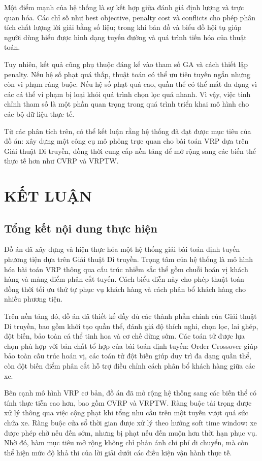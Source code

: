\documentclass[12pt,a4paper]{article}
\numberwithin{figure}{subsection}
\begin{document}
Một điểm mạnh của hệ thống là sự kết hợp giữa đánh giá định lượng và trực quan hóa. Các chỉ số như best objective, penalty cost và conflicts cho phép phân tích chất lượng lời giải bằng số liệu; trong khi bản đồ và biểu đồ hội tụ giúp người dùng hiểu được hình dạng tuyến đường và quá trình tiến hóa của thuật toán.

Tuy nhiên, kết quả cũng phụ thuộc đáng kể vào tham số GA và cách thiết lập penalty. Nếu hệ số phạt quá thấp, thuật toán có thể ưu tiên tuyến ngắn nhưng còn vi phạm ràng buộc. Nếu hệ số phạt quá cao, quần thể có thể mất đa dạng vì các cá thể vi phạm bị loại khỏi quá trình chọn lọc quá nhanh. Vì vậy, việc tinh chỉnh tham số là một phần quan trọng trong quá trình triển khai mô hình cho các bộ dữ liệu thực tế.

Từ các phân tích trên, có thể kết luận rằng hệ thống đã đạt được mục tiêu của đồ án: xây dựng một công cụ mô phỏng trực quan cho bài toán VRP dựa trên Giải thuật Di truyền, đồng thời cung cấp nền tảng để mở rộng sang các biến thể thực tế hơn như CVRP và VRPTW.

\section{KẾT LUẬN}

\subsection{Tổng kết nội dung thực hiện}

Đồ án đã xây dựng và hiện thực hóa một hệ thống giải bài toán định tuyến phương tiện dựa trên Giải thuật Di truyền. Trọng tâm của hệ thống là mô hình hóa bài toán VRP thông qua cấu trúc nhiễm sắc thể gồm chuỗi hoán vị khách hàng và mảng điểm phân cắt tuyến. Cách biểu diễn này cho phép thuật toán đồng thời tối ưu thứ tự phục vụ khách hàng và cách phân bổ khách hàng cho nhiều phương tiện.

Trên nền tảng đó, đồ án đã thiết kế đầy đủ các thành phần chính của Giải thuật Di truyền, bao gồm khởi tạo quần thể, đánh giá độ thích nghi, chọn lọc, lai ghép, đột biến, bảo toàn cá thể tinh hoa và cơ chế dừng sớm. Các toán tử được lựa chọn phù hợp với bản chất tổ hợp của bài toán định tuyến: Order Crossover giúp bảo toàn cấu trúc hoán vị, các toán tử đột biến giúp duy trì đa dạng quần thể, còn đột biến điểm phân cắt hỗ trợ điều chỉnh cách phân bổ khách hàng giữa các xe.

Bên cạnh mô hình VRP cơ bản, đồ án đã mở rộng hệ thống sang các biến thể có tính thực tiễn cao hơn, bao gồm CVRP và VRPTW. Ràng buộc tải trọng được xử lý thông qua việc cộng phạt khi tổng nhu cầu trên một tuyến vượt quá sức chứa xe. Ràng buộc cửa sổ thời gian được xử lý theo hướng soft time window: xe được phép chờ nếu đến sớm, nhưng bị phạt nếu đến muộn hơn thời hạn phục vụ. Nhờ đó, hàm mục tiêu mở rộng không chỉ phản ánh chi phí di chuyển, mà còn thể hiện mức độ khả thi của lời giải dưới các điều kiện vận hành thực tế.
\end{document}
